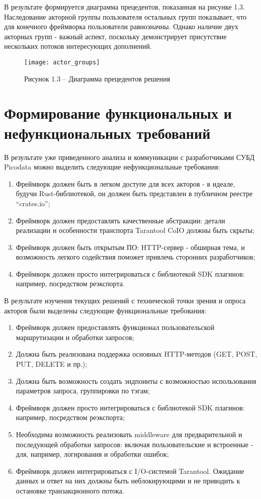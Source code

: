 \documentclass[times,numbers=noenddot]{itmo-student-thesis}
\begin{document}
В результате формируется диаграмма прецедентов, показанная на рисунке 1.3.
Наследование акторной группы пользователя остальных групп показывает, что для конечного фреймворка пользователи равнозначны.
Однако наличие двух акторных групп - важный аспект, поскольку демонстрирует присутствие нескольких потоков интересующих дополнений.

\begin{figure}[!h]
	\caption*{Рисунок 1.3 -- Диаграмма прецедентов решения}\label{fig3}
	\centering
	\texttt{[image: actor\_groups]}
\end{figure}

\section{Формирование функциональных и нефункциональных требований}\label{sec:requirements}

В результате уже приведенного анализа и коммуникации с разработчиками СУБД Picodata можно выделить следующие нефункциональные требования:

\begin{enumerate}[label=\arabic*.]
	\item Фреймворк должен быть в легком доступе для всех акторов - в идеале, будучи Rust-библиотекой, он должен быть представлен в публичном реестре “crates.io”;
	\item Фреймворк должен предоставлять качественные абстракции: детали реализации и особенности транспорта Tarantool CoIO должны быть скрыты;
	\item Фреймворк должен быть открытым ПО: HTTP-сервер - обширная тема, и возможность легкого содействия поможет привлечь сторонних разработчиков;
	\item Фреймворк должен просто интегрироваться с библиотекой SDK плагинов: например, посредством реэкспорта.
\end{enumerate}

В результате изучения текущих решений с технической точки зрения и опроса акторов были выделены следующие функциональные требования:

\begin{enumerate}[label=\arabic*.]
	\item Фреймворк должен предоставлять функционал пользовательской маршрутизации и обработки запросов;
	\item Должна быть реализована поддержка основных HTTP-методов (GET, POST, PUT, DELETE и пр.);
	\item Должна быть возможность создать эндпоинты с возможностью использования параметров запроса, группировки по тэгам;
	\item Фреймворк должен просто интегрироваться с библиотекой SDK плагинов: например, посредством реэкспорта;
	\item Необходима возможность реализовать middleware для предварительной и последующей обработки запросов: включая пользовательские и встроенные - для, например, логирования и обработки ошибок;
	\item Фреймворк должен интегрироваться с I/O-системой Tarantool. Ожидание данных и ответ на них должны быть неблокирующими и не приводить к остановке транзакционного потока.
\end{enumerate}
\end{document}
